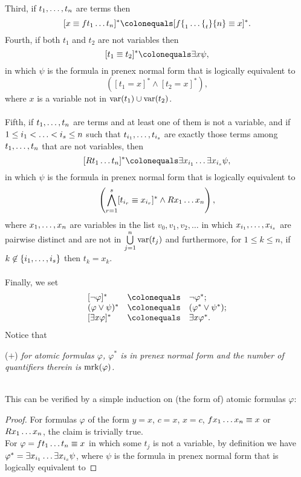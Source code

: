 \begin{enumerate}[1.]
Third, if $\seq[1]{t}{n}$ are terms then
\[
[x \equal f\enum[1]{t}{n}]^\ast \colonequals [f\enum[1]{t}{n} \equal x]^\ast.
\]
Fourth, if both $t_1$ and $t_2$ are not variables then
\[
[t_1 \equal t_2]^\ast \colonequals \exists x \psi,
\]
in which $\psi$ is the formula in prenex normal form that is logically equivalent to
\[
([t_1 \equal x]^\ast \land [t_2 \equal x]^\ast),
\]
where $x$ is a variable not in $\var{t_1} \cup \var{t_2}$.\\
\ \\
Fifth, if $\seq[1]{t}{n}$ are terms and at least one of them is not a variable, and if $1 \leq \enumpop{i_1}{<}{i_s} \leq n$ such that $\seq[i_1]{t}{i_s}$ are exactly those terms among $\seq[1]{t}{n}$ that are not variables, then
\[
[R\enum[1]{t}{n}]^\ast \colonequals \enump{\exists x_{i_1}}{\exists x_{i_s}} \psi,
\]
in which $\psi$ is the formula in prenex normal form that is logically equivalent to
\[
\parenadj{\bigwedge^s_{r = 1} [t_{i_r} \equal x_{i_r}]^\ast \land R\enum[1]{x}{n}},
\]
where $\seq[1]{x}{n}$ are variables in the list $v_0, v_1, v_2, \ldots$ in which $\seq[i_1]{x}{i_s}$ are pairwise distinct and are not in $\bigcup\limits^n_{j = 1}\var{t_j}$ and furthermore, for $1 \leq k \leq n$, if $k \not\in \{ \seq[1]{i}{s} \}$ then $t_k = x_k$.\\
\ \\
Finally, we set
\[
\begin{array}{lll}
[\neg\varphi]^\ast & \colonequals & \neg\varphi^\ast; \cr
(\varphi \lor \psi)^\ast & \colonequals & (\varphi^\ast \lor \psi^\ast); \cr
[\exists x \varphi]^\ast & \colonequals & \exists x \varphi^\ast.
\end{array}
\]
Notice that\smallskip\\
\begin{bquoteno}{68ex}{($+$)}
\emph{for atomic formulas $\varphi$, $\varphi^\ast$ is in prenex normal form and the number of quantifiers therein is $\mrk{\varphi}$.}
\end{bquoteno}\smallskip\\
This can be verified by a simple induction on (the form of) atomic formulas $\varphi$:
\begin{proof} For formulas $\varphi$ of the form $y \equal x$, $c \equal x$, $x \equal c$, $f\enum[1]{x}{n} \equal x$ or $R\enum[1]{x}{n}$, the claim is trivially true.\medskip\\
For $\varphi = f\enum[1]{t}{n} \equal x$ in which some $t_j$ is not a variable, by definition we have $\varphi^\ast = \enump{\exists x_{i_1}}{\exists x_{i_s}} \psi$, where $\psi$ is the formula in prenex normal form that is logically equivalent to

\end{proof}
\end{enumerate}
